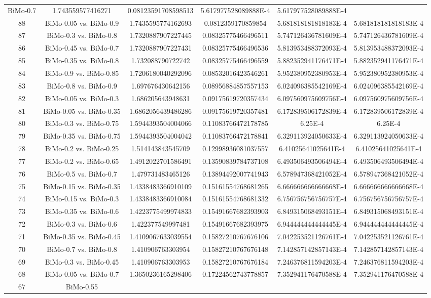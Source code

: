 \documentclass[a4paper,10pt]{article}
\begin{document}
\begin{landscape}
\begin{table}[!htp]
\begin{tabular}{cccccc}
BiMo-0.7&1.743559577416271&0.08123591708598513&5.617977528089888E-4&5.617977528089888E-4\\88&BiMo-0.05 vs. BiMo-0.9&1.7435595774162693&0.0812359170859854&5.681818181818183E-4&5.681818181818183E-4\\87&BiMo-0.3 vs. BiMo-0.8&1.7320887907227445&0.08325775466496511&5.747126436781609E-4&5.747126436781609E-4\\86&BiMo-0.45 vs. BiMo-0.7&1.7320887907227431&0.08325775466496536&5.813953488372093E-4&5.813953488372093E-4\\85&BiMo-0.35 vs. BiMo-0.8&1.732088790722742&0.08325775466496559&5.882352941176471E-4&5.882352941176471E-4\\84&BiMo-0.9 vs. BiMo-0.85&1.7206180040292096&0.08532016423546261&5.952380952380953E-4&5.952380952380953E-4\\83&BiMo-0.8 vs. BiMo-0.9&1.697676430642156&0.08956884857557153&6.024096385542169E-4&6.024096385542169E-4\\82&BiMo-0.05 vs. BiMo-0.3&1.686205643948631&0.09175619720357434&6.097560975609756E-4&6.097560975609756E-4\\81&BiMo-0.05 vs. BiMo-0.35&1.6862056439486286&0.09175619720357481&6.172839506172839E-4&6.172839506172839E-4\\80&BiMo-0.3 vs. BiMo-0.75&1.5944393504004066&0.11083766472178785&6.25E-4&6.25E-4\\79&BiMo-0.35 vs. BiMo-0.75&1.5944393504004042&0.11083766472178841&6.329113924050633E-4&6.329113924050633E-4\\78&BiMo-0.2 vs. BiMo-0.25&1.514143843545709&0.12998936081037557&6.41025641025641E-4&6.41025641025641E-4\\77&BiMo-0.2 vs. BiMo-0.65&1.4912022701586491&0.13590839784737108&6.493506493506494E-4&6.493506493506494E-4\\76&BiMo-0.5 vs. BiMo-0.7&1.479731483465126&0.13894492007741943&6.578947368421052E-4&6.578947368421052E-4\\75&BiMo-0.15 vs. BiMo-0.35&1.4338483366910109&0.15161554768681265&6.666666666666668E-4&6.666666666666668E-4\\74&BiMo-0.15 vs. BiMo-0.3&1.4338483366910084&0.15161554768681332&6.756756756756757E-4&6.756756756756757E-4\\73&BiMo-0.35 vs. BiMo-0.6&1.4223775499974833&0.15491667682393903&6.849315068493151E-4&6.849315068493151E-4\\72&BiMo-0.3 vs. BiMo-0.6&1.422377549997481&0.15491667682393975&6.944444444444445E-4&6.944444444444445E-4\\71&BiMo-0.35 vs. BiMo-0.45&1.4109067633039554&0.15827210767676106&7.042253521126761E-4&7.042253521126761E-4\\70&BiMo-0.7 vs. BiMo-0.8&1.410906763303954&0.15827210767676148&7.142857142857143E-4&7.142857142857143E-4\\69&BiMo-0.3 vs. BiMo-0.45&1.410906763303953&0.15827210767676184&7.246376811594203E-4&7.246376811594203E-4\\68&BiMo-0.05 vs. BiMo-0.7&1.3650236165298406&0.17224562743778857&7.352941176470588E-4&7.352941176470588E-4\\67&BiMo-0.55 
\end{tabular}
\end{table}
\end{landscape}
\end{document}
